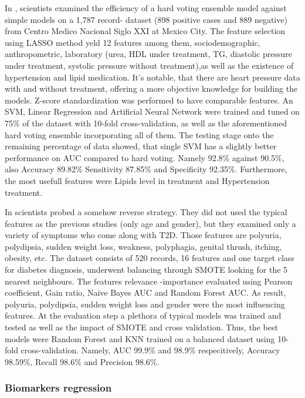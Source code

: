 \documentclass[journal,article,submit,pdftex,moreauthors]{Definitions/mdpi}
\begin{document}
\par In \cite{Benita}, scientists examined the efficiency of a hard voting ensemble model against simple models on a 1,787 record-
dataset (898 positive cases and 889 negative) from Centro Medico Nacional Siglo XXI at Mexico City. The feature selection using LASSO
method yeld 12 features among them, sociodemographic, anthropometric, laboratory (urea, HDL under treatment, TG, diastolic pressure under
treatment, systolic pressure without treatment),as well as the existence of hypertension and lipid medication. It's notable, that
there are heart pressure data with and without treatment, offering a more objective knowledge for building the models. Z-score
standardization was performed to have comparable features. An SVM, Linear Regression and Artificial Neural Network were trained and tuned
on 75\% of the dataset with 10-fold cross-validation, as well as the aforementioned hard voting ensemble incorporating all of them.
The testing stage onto the remaining percentage of data showed, that single SVM has a slightly better performance
on AUC compared to hard voting. Namely 92.8\% against 90.5\%, also Accuracy  89.82\% Sensitivity 87.85\% and Specificity 92.35\%.
Furthermore, the most usefull features were Lipids level in treatment and Hypertension treatment.
\par In \cite{Dritsas} scientists probed a somehow reverse strategy. They did not used the typical features as the previous studies
(only age and gender), but they examined only a variety of symptoms who come along with T2D. Those features are polyuria, polydipsia,
sudden weight loss, weakness, polyphagia, genital thrush, itching, obesity, etc. The dataset consists of 520 records, 16 features and
one target class for diabetes diagnosis, underwent balancing through SMOTE looking for the 5 nearest neighbours. The features relevance
-importance evaluated using Pearson coefficient, Gain ratio, Naive Bayes AUC and Random Forest AUC. As result, polyuria, polydipsia,
sudden weight loss and gender were the most influencing features. At the evaluation step a plethora of typical models was trained
and tested as well as the impact of SMOTE and cross validation. Thus, the best models were Random Forest and KNN trained on a balanced
dataset using 10-fold cross-validation. Namely, AUC 99.9\% and 98.9\% respecitively,  Accuracy 98.59\%, Recall 98.6\% and Precision
98.6\%.


\subsubsection{Biomarkers regression}
\end{document}
